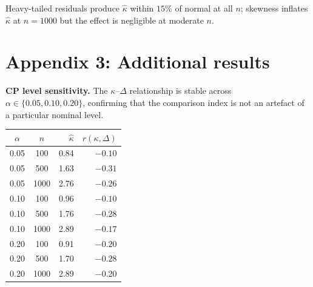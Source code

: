 \documentclass[lineno]{biometrika}
\begin{document}
Heavy-tailed residuals produce $\hat\kappa$ within $15\%$ of normal at all $n$; skewness inflates $\hat\kappa$ at $n=1000$ but the effect is negligible at moderate $n$.

\appendixthree
\section*{Appendix 3: Additional results}

\textbf{CP level sensitivity.}
The $\kappa$--$\Delta$ relationship is stable across $\alpha \in \{0.05, 0.10, 0.20\}$, confirming that the comparison index is not an artefact of a particular nominal level.
\begin{table}[ht]
{\begin{tabular}{ccrr}
$\alpha$ & $n$ & $\hat\kappa$ & $r(\kappa,\Delta)$ \\ \hline
0.05 & 100 & 0.84 & $-0.10$ \\
0.05 & 500 & 1.63 & $-0.31$ \\
0.05 & 1000 & 2.76 & $-0.26$ \\
0.10 & 100 & 0.96 & $-0.10$ \\
0.10 & 500 & 1.76 & $-0.28$ \\
0.10 & 1000 & 2.89 & $-0.17$ \\
0.20 & 100 & 0.91 & $-0.20$ \\
0.20 & 500 & 1.70 & $-0.28$ \\
0.20 & 1000 & 2.89 & $-0.20$
\end{tabular}}
\end{table}
\end{document}
